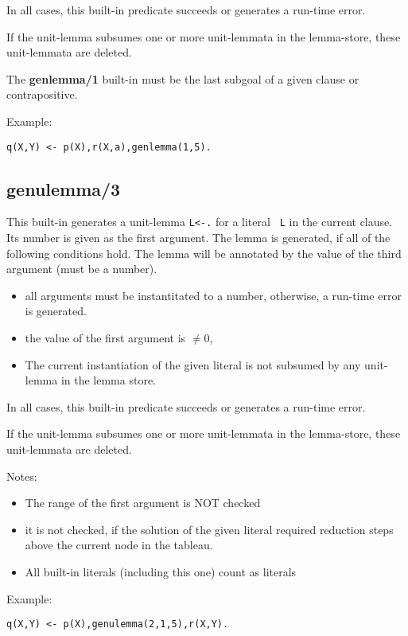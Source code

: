 In all cases, this built-in predicate succeeds or generates a run-time
error.

If the unit-lemma subsumes one or more unit-lemmata in the lemma-store,
these unit-lemmata are deleted.

The {\bf genlemma/1} built-in must be the last subgoal of a given
clause or contrapositive.

Example:
\begin{verbatim}
q(X,Y) <- p(X),r(X,a),genlemma(1,5).
\end{verbatim}


\subsection{genulemma/3}

This built-in generates a unit-lemma {\tt L<-.} for a literal
{\tt ~L} in the current clause. Its number is given as the first argument.
The lemma is generated, if all of the following
conditions hold.
The lemma will be annotated by the value of the third argument
(must be a number).

\begin{itemize}
\item
all arguments must be instantitated to a number,
otherwise, a run-time error is generated.
\item
the value of the first argument is $\neq 0$,
\item
The current instantiation of the given literal is not subsumed
by any unit-lemma in the lemma store.
\end{itemize}

In all cases, this built-in predicate succeeds or generates a run-time
error.

If the unit-lemma subsumes one or more unit-lemmata in the lemma-store,
these unit-lemmata are deleted.

Notes:
\begin{itemize}
\item
The range of the first argument is NOT checked
\item
it is not checked, if the solution of the given literal required
reduction steps above the current node in the tableau.
\item
All built-in literals (including this one) count as literals
\end{itemize}



Example:
\begin{verbatim}
q(X,Y) <- p(X),genulemma(2,1,5),r(X,Y).
\end{verbatim}

